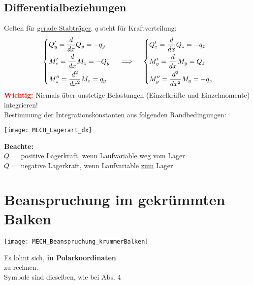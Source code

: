\documentclass[numerate]{cheatsheet}
\begin{document}
    \subsection{Differentialbeziehungen}
        \begin{scriptsize}
            Gelten für \underline{gerade Stabträger}. $q$ steht für Kraftverteilung:
            \[
            \begin{dcases}
                Q'_y = \frac{d}{dx} Q_y = -q_y \\
                M'_z = \frac{d}{dx} M_z = -Q_y \\
                M''_z = \frac{d^2}{dx^2} M_z  =q_y
            \end{dcases}
            \quad \implies \quad 
            \begin{dcases}
                Q'_z = \frac{d}{dx}Q_z = -q_z \\
                M_y' = \frac{d}{dx} M_y = Q_z \\
                M_y'' = \frac{d^2}{dx^2} M_y = -q_z
            \end{dcases}
            \]
            \textcolor{Red}{\textbf{Wichtig:}} Niemals über unstetige Belastungen (Einzelkräfte und Einzelmomente) integrieren! \\Bestimmung der Integrationskonstanten aus folgenden Randbedingungen:  
            \begin{center}
                \vspace{2mm} \texttt{[image: MECH\_Lagerart\_dx]}
            \end{center}
            \textbf{Beachte:}
            \\ $Q =$ positive Lagerkraft, wenn Laufvariable \underline{weg} vom Lager
            \\ $Q =$ negative Lagerkraft, wenn Laufvariable \underline{zum} Lager    
        \end{scriptsize}   
        
    \section{Beanspruchung im gekrümmten Balken}
        \begin{scriptsize}
            \begin{minipage}{0.5\linewidth}
                \texttt{[image: MECH\_Beanspruchung\_krummerBalken]}
            \end{minipage}   
            \begin{minipage}{0.48\linewidth}
                Es lohnt sich, \textbf{in Polarkoordinaten} \\zu rechnen.
                \\Symbole sind dieselben, wie bei Abs. 4
            \end{minipage}
        \end{scriptsize} 
     
\end{document}

